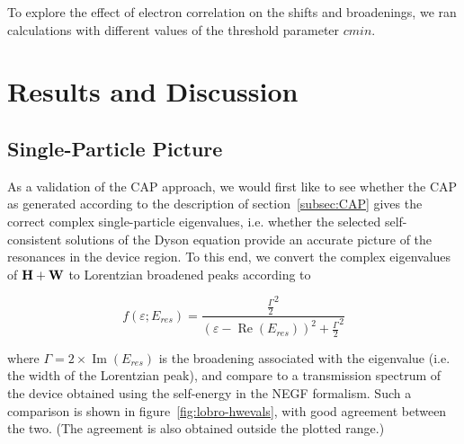 To explore the effect of electron correlation on the shifts and broadenings, we
ran calculations with different values of the threshold parameter $cmin$.

\section{Results and Discussion}
\label{sec:results}

\subsection{Single-Particle Picture}
\label{subsec:SingleParticle}

As a validation of the \ac{CAP} approach, we would first like to see whether
the \ac{CAP} as generated according to the description of
section~\ref{subsec:CAP} gives the correct complex single-particle eigenvalues,
i.e. whether the selected self-consistent solutions of the Dyson equation
provide an accurate picture of the resonances in the device region. To this
end, we convert the complex eigenvalues of $\mathbf{H} + \mathbf{W}$ to Lorentzian
broadened peaks according to

\begin{equation}
	f(\varepsilon;E_{res})
	= \frac{\frac{\Gamma}{2}^2}
	       {(\varepsilon - \operatorname{Re}(E_{res}))^2
	       + \frac{\Gamma}{2}^2}
	\label{eq:lobro}
\end{equation}

where $\Gamma = 2 \times \operatorname{Im}(E_{res})$ is the broadening
associated with the eigenvalue (i.e. the width of the Lorentzian peak), and
compare to a transmission spectrum of the device obtained using the self-energy
in the \ac{NEGF} formalism. Such a comparison is shown in
figure~\ref{fig:lobro-hwevals}, with good agreement between the two. (The
agreement is also obtained outside the plotted range.)

